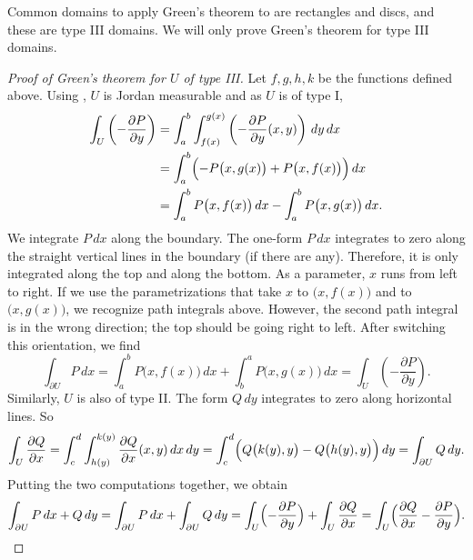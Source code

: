 Common domains to apply Green's theorem to are rectangles and discs, and
these are type III domains.
We will only prove Green's theorem for type III domains.

\begin{proof}[Proof of Green's theorem for $U$ of type III]
Let $f,g,h,k$ be the functions defined above.
Using ,
$U$ is Jordan measurable and as $U$ is of type I\@,
\begin{equation*}
\begin{split}
\int_U 
\left(- \frac{\partial P}{\partial y} \right)
& =
\int_a^b \int_{f(x)}^{g(x)}
\left(- \frac{\partial P}{\partial y} (x,y) \right)
\, dy \, dx 
\\
& =
\int_a^b \Bigl(
- P\bigl(x,g(x)\bigr) +
P\bigl(x,f(x)\bigr)
\Bigr) \, dx
\\
& =
\int_a^b P\bigl(x,f(x)\bigr) \, dx 
-
\int_a^b P\bigl(x,g(x)\bigr) \, dx .
\end{split}
\end{equation*}
We integrate $P\,dx$ along the boundary.
The one-form $P\,dx$ integrates to zero 
along the straight vertical lines in the boundary (if there are any).
Therefore, it is only
integrated along the top and along the bottom.  As a parameter,
$x$ runs from left to right.  If we use the parametrizations that take $x$
to $\bigl(x,f(x)\bigr)$ and to
$\bigl(x,g(x)\bigr)$, we recognize path integrals above.  However, the second
path integral is in the wrong direction; the top should be going right to
left.  After switching this orientation, we find
\begin{equation*}
\int_{\partial U} P \, dx
=
\int_a^b P\bigl(x,f(x)\bigr) \, dx 
+
\int_b^a P\bigl(x,g(x)\bigr) \, dx
=
\int_U 
\left(- \frac{\partial P}{\partial y} \right) .
\end{equation*}
Similarly, $U$ is also of type II\@.  The form $Q\,dy$ integrates to zero along
horizontal lines.   So
\begin{equation*}
\int_U 
\frac{\partial Q}{\partial x}
=
\int_c^d \int_{h(y)}^{k(y)}
\frac{\partial Q}{\partial x}(x,y)
\, dx \, dy 
=
\int_c^d \Bigl(
Q\bigl(k(y),y\bigr) 
-
Q\bigl(h(y),y\bigr)
\Bigr) \, dy 
=
\int_{\partial U} Q \, dy .
\end{equation*}
Putting the two computations together, we obtain
\begin{equation*}
\int_{\partial U} P\, dx + Q \, dy 
=
\int_{\partial U} P\, dx + \int_{\partial U} Q \, dy 
=
\int_U 
\Bigl(-\frac{\partial P}{\partial y}\Bigr)
+
\int_U 
\frac{\partial Q}{\partial x}
=
\int_U 
\Bigl(
\frac{\partial Q}{\partial x}
-\frac{\partial P}{\partial y}
\Bigr) . \qedhere
\end{equation*}
\end{proof}

